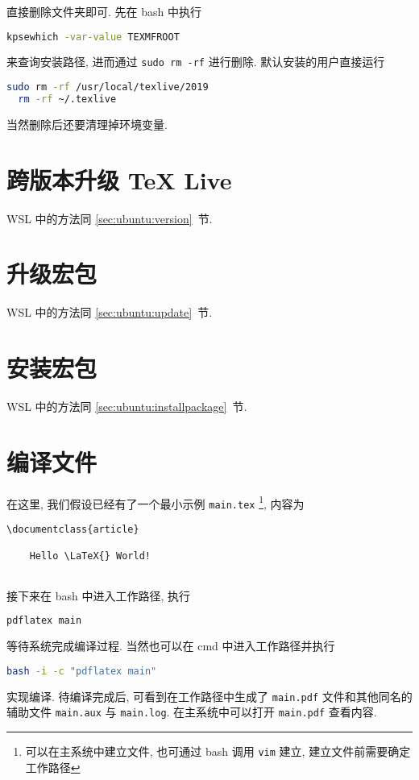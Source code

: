 直接删除文件夹即可.
先在 \textsf{bash} 中执行
\begin{lstlisting}[language = bash]
  kpsewhich -var-value TEXMFROOT
\end{lstlisting}
来查询安装路径,
进而通过 \texttt{sudo rm -rf} 进行删除.
默认安装的用户直接运行
\begin{lstlisting}[language = bash]
  sudo rm -rf /usr/local/texlive/2019
  rm -rf ~/.texlive
\end{lstlisting}
当然删除后还要清理掉环境变量.

\section{跨版本升级 \TeX{} Live}

WSL 中的方法同 \ref{sec:ubuntu:version}~节.

\section{升级宏包}

WSL 中的方法同 \ref{sec:ubuntu:update}~节.

\section{安装宏包}

WSL 中的方法同 \ref{sec:ubuntu:installpackage}~节.

\section{编译文件}

在这里, 我们假设已经有了一个最小示例 \texttt{main.tex}%
\footnote{可以在主系统中建立文件,
也可通过 \textsf{bash} 调用 \texttt{vim} 建立,
建立文件前需要确定工作路径},
内容为
\begin{lstlisting}[language = {[LaTeX]TeX}]
  \documentclass{article}
  
    Hello \LaTeX{} World!
  
\end{lstlisting}
接下来在 \textsf{bash} 中进入工作路径,
执行
\begin{lstlisting}[language=bash]
  pdflatex main
\end{lstlisting}
等待系统完成编译过程. 
当然也可以在 \textsf{cmd} 中进入工作路径并执行
\begin{lstlisting}[language=bash]
  bash -i -c "pdflatex main"
\end{lstlisting}
实现编译.
待编译完成后, 可看到在工作路径中生成了 \texttt{main.pdf} 文件和其他同名的辅助文件 \texttt{main.aux} 与 \texttt{main.log}.
在主系统中可以打开 \texttt{main.pdf} 查看内容.

